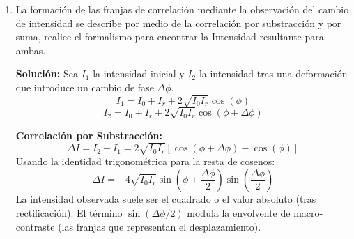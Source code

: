 \documentclass[12pt, letterpaper]{article}
\begin{document}
\begin{enumerate}
		\textbf{Solución:}
		\begin{itemize}
			\item \textbf{a) Muestreo Espacial con arreglos CCD:} Es el proceso de convertir una distribución de intensidad óptica continua en una matriz de valores discretos utilizando una cuadrícula bidimensional de fotorreceptores (píxeles). Cada píxel integra la luz que incide sobre su área durante un tiempo determinado.
			\item \textbf{b) Resolución espacial:} Es la capacidad del sistema para distinguir detalles pequeños y cercanos en el patrón óptico. En un CCD, está limitada por el tamaño (pitch) de los píxeles; píxeles más pequeños permiten detectar franjas más finas.
			\item \textbf{c) Teorema de muestreo (Nyquist):} Establece que para reconstruir fielmente una señal espacial (como un patrón de franjas) sin pérdida de información, la frecuencia de muestreo espacial ($f_s$) debe ser al menos el doble de la frecuencia espacial máxima presente en la señal ($f_{max}$). Es decir, se requieren al menos dos píxeles por cada periodo de franja.
			\item \textbf{d) Aliasing:} Es el efecto que ocurre cuando se viola el teorema de Nyquist (frecuencias espaciales altas se muestrean con muy pocos píxeles). Se manifiesta como la aparición de falsas franjas de baja frecuencia (patrones de Moiré) que no existen en la señal óptica original.
		\end{itemize}
		
		\item La formación de las franjas de correlación mediante la observación del cambio de intensidad se describe por medio de la correlación por substracción y por suma, realice el formalismo para encontrar la Intensidad resultante para ambas.
		
		\textbf{Solución:}
		Sea $I_1$ la intensidad inicial y $I_2$ la intensidad tras una deformación que introduce un cambio de fase $\Delta\phi$.
		$$ I_1 = I_0 + I_r + 2\sqrt{I_0 I_r}\cos(\phi) $$
		$$ I_2 = I_0 + I_r + 2\sqrt{I_0 I_r}\cos(\phi + \Delta\phi) $$
		
		\textbf{Correlación por Substracción:}
		$$ \Delta I = I_2 - I_1 = 2\sqrt{I_0 I_r} [ \cos(\phi + \Delta\phi) - \cos(\phi) ] $$
		Usando la identidad trigonométrica para la resta de cosenos:
		$$ \Delta I = -4\sqrt{I_0 I_r} \sin\left(\phi + \frac{\Delta\phi}{2}\right) \sin\left(\frac{\Delta\phi}{2}\right) $$
		La intensidad observada suele ser el cuadrado o el valor absoluto (tras rectificación). El término $\sin(\Delta\phi/2)$ modula la envolvente de macro-contraste (las franjas que representan el desplazamiento).
		

\end{enumerate}
\end{document}
